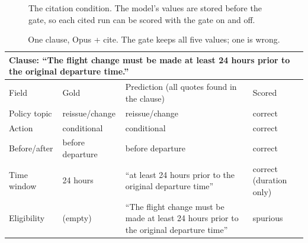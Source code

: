 \documentclass[11pt,a4paper]{article}
\begin{document}
\begin{figure}[h]
\centering
{}
\caption{The citation condition. The model's values are stored before the gate, so each cited run can be scored with the gate on and off.}
\label{fig:pipeline}
\end{figure}

\begin{table}[h]
\centering
\small
\begin{tabular}{p{2.1cm}p{2.3cm}p{4.3cm}l}
\toprule
\multicolumn{4}{p{12.5cm}}{Clause: ``The flight change must be made at least 24 hours prior to the original departure time.''} \\
\midrule
Field & Gold & Prediction (all quotes found in the clause) & Scored \\
\midrule
Policy topic & reissue/change & reissue/change & correct \\
Action & conditional & conditional & correct \\
Before/after & before departure & before departure & correct \\
Time window & 24 hours & ``at least 24 hours prior to the original departure time'' & correct (duration only) \\
Eligibility & (empty) & ``The flight change must be made at least 24 hours prior to the original departure time'' & spurious \\
\bottomrule
\end{tabular}
\caption{One clause, Opus + cite. The gate keeps all five values; one is wrong.}
\label{tab:example}
\end{table}
\end{document}
